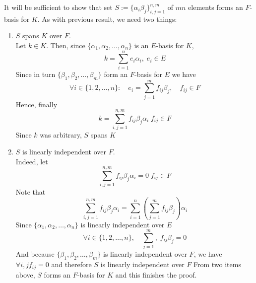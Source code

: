 \documentclass[8pt]{article} %
\newenvironment{proof}[1][Proof]{\begin{trivlist}
\item[\hskip \labelsep {\bfseries #1}]}{\qed\end{trivlist}}
\newcommand{\qed}{\nobreak \ifvmode \relax \else
\ifdim\lastskip<1.5em \hskip-\lastskip
\hskip1.5em plus0em minus0.5em \fi \nobreak
  \vrule height0.75em width0.5em depth0.25em\fi}
\begin{document}
\begin{proof}
It will be sufficient to show that set $S:=\{\alpha_i\beta_j\}_{i,j=1}^{n,m}$ of $mn$ elements forms an $F$-basis for $K$. As with previous result,
we need two things:
\begin{enumerate}
\item{$S$ spans $K$ over $F$.\\
Let $k\in K$. Then, since 
$\{\alpha_1,\alpha_2,\dots,\alpha_n\}$ is an $E$-basis for $K$,
\[k=\sum_{i=1}^n e_i\alpha_i,\; e_i\in E\]
Since in turn $\{\beta_1,\beta_2,\dots,\beta_m\}$ form an $F$-basis for $E$ we have
\[\forall i\in\{1,2,\dots,n\}:\quad e_i=\sum_{j=1}^m f_{ij}\beta_j,\quad f_{ij}\in F\]
Hence, finally
\[k=\sum_{i,j=1}^{n,m}f_{ij}\beta_j\alpha_i\;f_{ij}\in F\]
Since $k$ was arbitrary, $S$ spans $K$}
\item{$S$ is linearly independent over $F$.\\
	Indeed, let
	\[\sum_{i,j=1}^{n,m}f_{ij}\beta_j\alpha_i=0\;f_{ij}\in F\]
	Note that
	\[\sum_{i,j=1}^{n,m}f_{ij}\beta_j\alpha_i=\sum_{i=1}^n (\sum_{j=1}^m f_{ij}\beta_j)\alpha_i\]
	Since
	$\{\alpha_1,\alpha_2,\dots,\alpha_n\}$ is linearly independent over $E$
	\[\forall i\in\{1,2,\dots,n\},\quad \sum_{j=1}^m,\; f_{ij}\beta_j=0\]
	And because $\{\beta_1,\beta_2,\dots,\beta_m\}$ is linearly independent over $F$, we have $\forall i,j f_{ij}=0$ and therefore $S$ is
	linearly independent over $F$
}
From two items above, $S$ forms an $F$-basis for $K$ and this finishes the proof.
\end{enumerate}
\end{proof}
\end{document}
